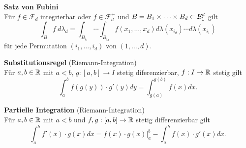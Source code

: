 \textbf{Satz von Fubini}\\
Für $f\in\mathcal{F}_d$ integrierbar oder $f\in\mathcal{F}_d^+$ und
$B = B_1\times\cdots\times B_d\subset\mathcal{B}_{1}^d$ gilt
\[
	\int_B f~d\lambda_d=\int_{B_{i_1}}\cdots\int_{B_{i_d}} f(x_1,\ldots,x_d)
	d\lambda(x_{i_d})\cdots d\lambda(x_{i_1})
\]
für jede Permutation $(i_1,\ldots,i_d)$ von $(1,\ldots,d)$.

\textbf{Substitutionsregel} (Riemann-Integration)\\
Für $a,b\in\mathbb{R}$ mit $a<b$, $g:[a,b]\to I$ stetig diferenzierbar, $f:I\to\mathbb{R}$ stetig gilt
\[
	\int_a^b f(g(y))\cdot g'(y)dy=\int_{g(a)}^{g(b)}f(x)dx.
\]

\textbf{Partielle Integration} (Riemann-Integration)\\
Für $a,b\in\mathbb{R}$ mit $a<b$ und $f,g:[a,b]\to\mathbb{R}$ stetig differenzierbar gilt
\[
	\int_a^b f'(x)\cdot g(x)dx 
	= f(x)\cdot g(x)\Big\vert_a^b-\int_a^b f(x)\cdot g'(x)dx.
\]
